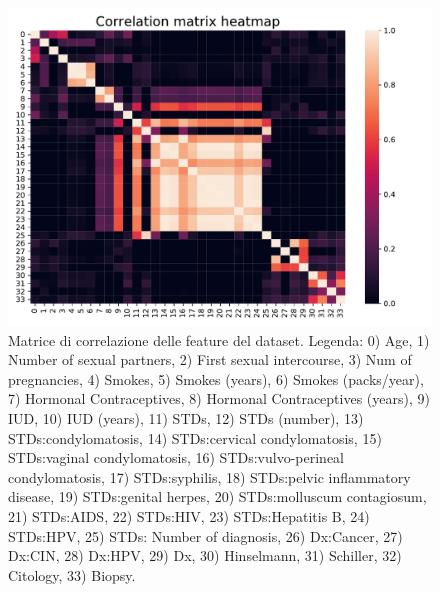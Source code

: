\begin{figure}
	\centering
	\includegraphics[width=1\linewidth]{images/corr_matrix}
	\caption{Matrice di correlazione delle feature del dataset. Legenda:
		0) Age,
		1) Number of sexual partners,
		2) First sexual intercourse,
		3) Num of pregnancies,
		4) Smokes,
		5) Smokes (years),
		6) Smokes (packs/year),
		7) Hormonal Contraceptives,
		8) Hormonal Contraceptives (years),
		9) IUD,
		10) IUD (years),
		11) STDs,
		12) STDs (number),
		13) STDs:condylomatosis,
		14) STDs:cervical condylomatosis,
		15) STDs:vaginal condylomatosis,
		16) STDs:vulvo-perineal condylomatosis,
		17) STDs:syphilis,
		18) STDs:pelvic inflammatory disease,
		19) STDs:genital herpes,
		20) STDs:molluscum contagiosum,
		21) STDs:AIDS,
		22) STDs:HIV,
		23) STDs:Hepatitis B,
		24) STDs:HPV,
		25) STDs: Number of diagnosis,
		26) Dx:Cancer,
		27) Dx:CIN,
		28) Dx:HPV,
		29) Dx,
		30) Hinselmann,
		31) Schiller,
		32) Citology,
		33) Biopsy.}
	\label{fig:corrmatrix}
\end{figure}

